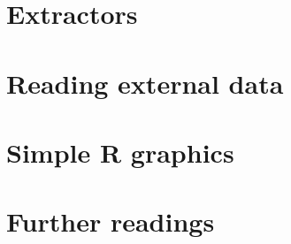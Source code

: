\documentclass[a4paper,12pt,oneside]{book}
\begin{document}
\hypertarget{extractors}{%
\section{Extractors}\label{extractors}}

\hypertarget{reading-external-data}{%
\section{Reading external data}\label{reading-external-data}}

\hypertarget{simple-r-graphics}{%
\section{Simple R graphics}\label{simple-r-graphics}}

\hypertarget{further-readings-12}{%
\section{Further readings}\label{further-readings-12}}
\end{document}
